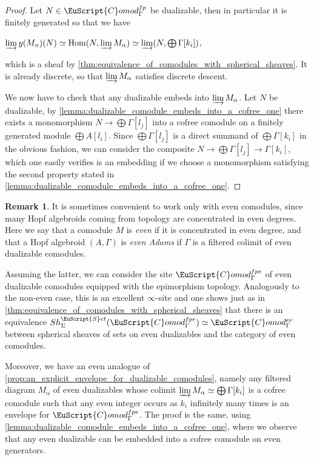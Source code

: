 \documentclass[oneside,a4paper]{amsart}
\newcommand{\euscr}[1]{\EuScript{#1}} %
\newcommand{\Hom}{\textnormal{Hom}} %
\newcommand{\sets}{\euscr{S}et} %
\newcommand{\Comod}{\euscr{C}omod} %
\newcommand{\ComodGamma}{\Comod_{\Gamma}} %
\theoremstyle{plain}
\theoremstyle{definition}
\newtheorem{rem}[thm]{Remark}
\theoremstyle{remark}
\begin{document}
\begin{proof}
Let $N \in \ComodGamma^{fp}$ be dualizable, then in particular it is finitely generated so that we have 

\begin{center}
$\varinjlim y(M_{\alpha})(N) \simeq \Hom(N, \varinjlim M_{\alpha}) \simeq \varinjlim(N, \bigoplus \Gamma[k_{i}])$,
\end{center}
which is a sheaf by \cref{thm:equivalence_of_comodules_with_spherical_sheaves}. It is already discrete, so that $\varinjlim M_{\alpha}$ satisfies discrete descent. 

We now have to check that any dualizable embeds into $\varinjlim M_{\alpha}$. Let $N$ be dualizable, by \cref{lemma:dualizable_comodule_embeds_into_a_cofree_one} there exists a monomorphism $N \rightarrow \bigoplus \Gamma[l_{j}]$ into a cofree comodule on a finitely generated module $\bigoplus A[l_{i}]$. Since $\bigoplus \Gamma[l_{j}]$ is a direct summand of $\bigoplus \Gamma[k_{i}]$ in the obvious fashion, we can consider the composite $N \rightarrow \bigoplus \Gamma[l_{j}] \rightarrow \Gamma[k_{i}]$, which one easily verifies is an embedding if we choose a monomorphism satisfying the second property stated in \cref{lemma:dualizable_comodule_embeds_into_a_cofree_one}.
\end{proof}

\begin{rem}
\label{rem:working_with_even_comodules_categories_envelopes}
It is sometimes convenient to work only with even comodules, since many Hopf algebroids coming from topology are concentrated in even degrees. Here we say that a comodule $M$ is \emph{even} if it is concentrated in even degree, and that a Hopf algebroid $(A, \Gamma)$ is \emph{even Adams} if $\Gamma$ is a filtered colimit of even dualizable comodules. 

Assuming the latter, we can consider the site $\ComodGamma^{fpe}$ of even dualizable comodules equipped with the epimorphism topology. Analogously to the non-even case, this is an excellent $\infty$-site and one shows just as in \cref{thm:equivalence_of_comodules_with_spherical_sheaves} that there is an equivalence $Sh_{\Sigma}^{\sets}(\ComodGamma^{fpe}) \simeq \ComodGamma^{ev}$ between spherical sheaves of sets on even dualizables and the category of even comodules. 

Moreover, we have an even analogue of \cref{prop:an_explicit_envelope_for_dualizable_comodules}, namely any filtered diagram $M_{\alpha}$ of even dualizables whose colimit $\varinjlim M_{\alpha} \simeq \bigoplus \Gamma[k_{i}]$ is a cofree comodule such that any even integer occurs as $k_{i}$ infinitely many times is an envelope for $\ComodGamma^{fpe}$. The proof is the same, using \cref{lemma:dualizable_comodule_embeds_into_a_cofree_one}, where we observe that any even dualizable can be embedded into a cofree comodule on even generators. 
\end{rem}
\end{document}
